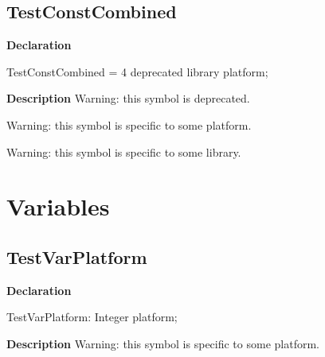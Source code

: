 \documentclass{report}
\newif\ifpdf
\begin{document}
\subsection*{TestConstCombined}
\fi
\label{ok_hint_directives-TestConstCombined}
\begin{list}{}{
\setlength{\itemindent}{0cm}
\setlength{\listparindent}{0cm}
\setlength{\leftmargin}{\evensidemargin}
\addtolength{\leftmargin}{\tmplength}
\settowidth{\labelsep}{X}
\addtolength{\leftmargin}{\labelsep}
\setlength{\labelwidth}{\tmplength}
}
\item[\textbf{Declaration}\hfill]
\ifpdf
\begin{flushleft}
\fi
\begin{ttfamily}
TestConstCombined = 4 deprecated library platform;\end{ttfamily}

\ifpdf
\end{flushleft}
\fi

\par
\item[\textbf{Description}]
Warning: this symbol is deprecated.

Warning: this symbol is specific to some platform.

Warning: this symbol is specific to some library.

 

\end{list}
\section{Variables}
\ifpdf
\subsection*{\large{\textbf{TestVarPlatform}}\normalsize\hspace{1ex}\hrulefill}
\else
\subsection*{TestVarPlatform}
\fi
\label{ok_hint_directives-TestVarPlatform}
\begin{list}{}{
\setlength{\itemindent}{0cm}
\setlength{\listparindent}{0cm}
\setlength{\leftmargin}{\evensidemargin}
\addtolength{\leftmargin}{\tmplength}
\settowidth{\labelsep}{X}
\addtolength{\leftmargin}{\labelsep}
\setlength{\labelwidth}{\tmplength}
}
\item[\textbf{Declaration}\hfill]
\ifpdf
\begin{flushleft}
\fi
\begin{ttfamily}
TestVarPlatform: Integer platform;\end{ttfamily}

\ifpdf
\end{flushleft}
\fi

\par
\item[\textbf{Description}]
Warning: this symbol is specific to some platform.

 

\end{list}
\ifpdf
\end{document}
